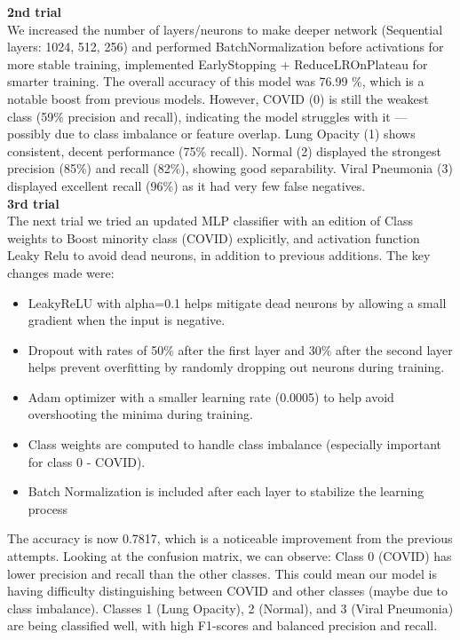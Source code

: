 \documentclass{article}
\begin{document}
\textbf{2nd trial}\\
We increased the number of layers/neurons to make deeper network (Sequential layers: 1024, 512, 256)
and performed BatchNormalization before activations for more stable training, implemented EarlyStopping + ReduceLROnPlateau for smarter training.
The overall accuracy of this model was 76.99 \%, which is a notable boost from previous models. However, COVID (0) is still the weakest class (59\% precision and recall), indicating the model struggles with it — possibly due to class imbalance or feature overlap. Lung Opacity (1) shows consistent, decent performance (75\% recall). Normal (2) displayed the strongest precision (85\%) and recall (82\%), showing good separability. Viral Pneumonia (3) displayed excellent recall (96\%) as it had very few false negatives.\\

\textbf{3rd trial}\\
The next trial  we tried an updated MLP classifier with an edition of Class weights to Boost minority class (COVID) explicitly, and activation function Leaky Relu to avoid dead neurons, in addition to previous additions. The key changes made were:
 \begin{itemize}
     \item LeakyReLU with alpha=0.1 helps mitigate dead neurons by allowing a small gradient when the input is negative.
     \item Dropout with rates of 50\% after the first layer and 30\% after the second layer helps prevent overfitting by randomly dropping out neurons during training.
     \item Adam optimizer with a smaller learning rate (0.0005) to help avoid overshooting the minima during training.
     \item Class weights are computed to handle class imbalance (especially important for class 0 - COVID).
     \item Batch Normalization is included after each layer to stabilize the learning process
\end{itemize}
The accuracy is now 0.7817, which is a noticeable improvement from the previous attempts. Looking at the confusion matrix, we can observe: Class 0 (COVID) has lower precision and recall than the other classes. This could mean our model is having difficulty distinguishing between COVID and other classes (maybe due to class imbalance). Classes 1 (Lung Opacity), 2 (Normal), and 3 (Viral Pneumonia) are being classified well, with high F1-scores and balanced precision and recall.\\
\end{document}
